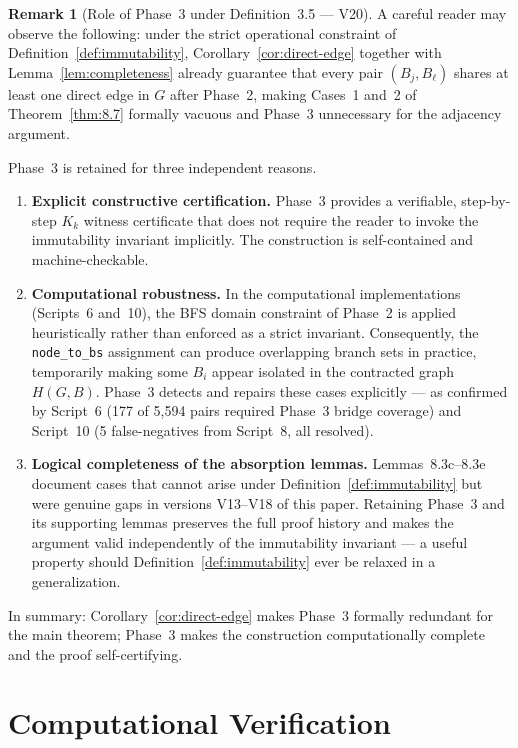 \documentclass[12pt,a4paper]{article}
\theoremstyle{definition}
\newtheorem{remark}[theorem]{Remark}
\begin{document}
\begin{remark}[Role of Phase~3 under Definition~3.5 --- V20]
\label{rem:phase3-redundancy}
A careful reader may observe the following: under the strict operational
constraint of Definition~\ref{def:immutability}, Corollary~\ref{cor:direct-edge}
together with Lemma~\ref{lem:completeness} already guarantee that every
pair $(B_j, B_\ell)$ shares at least one direct edge in $G$ after
Phase~2, making Cases~1 and~2 of Theorem~\ref{thm:8.7} formally vacuous
and Phase~3 unnecessary for the adjacency argument.

Phase~3 is retained for three independent reasons.
\begin{enumerate}[noitemsep,label=(\roman*)]
\item \textbf{Explicit constructive certification.}
  Phase~3 provides a verifiable, step-by-step $K_k$ witness certificate
  that does not require the reader to invoke the immutability invariant
  implicitly. The construction is self-contained and machine-checkable.
\item \textbf{Computational robustness.}
  In the computational implementations (Scripts~6 and~10), the BFS
  domain constraint of Phase~2 is applied heuristically rather than
  enforced as a strict invariant. Consequently, the \texttt{node\_to\_bs}
  assignment can produce overlapping branch sets in practice, temporarily
  making some $B_i$ appear isolated in the contracted graph $H(G,B)$.
  Phase~3 detects and repairs these cases explicitly --- as confirmed
  by Script~6 (177 of 5,594 pairs required Phase~3 bridge coverage)
  and Script~10 (5 false-negatives from Script~8, all resolved).
\item \textbf{Logical completeness of the absorption lemmas.}
  Lemmas~8.3c--8.3e document cases that cannot arise under
  Definition~\ref{def:immutability} but were genuine gaps in versions
  V13--V18 of this paper. Retaining Phase~3 and its supporting lemmas
  preserves the full proof history and makes the argument valid
  independently of the immutability invariant --- a useful property
  should Definition~\ref{def:immutability} ever be relaxed in a
  generalization.
\end{enumerate}
In summary: Corollary~\ref{cor:direct-edge} makes Phase~3 formally
redundant for the main theorem; Phase~3 makes the construction
computationally complete and the proof self-certifying.
\end{remark}

\section{Computational Verification}
\end{document}
